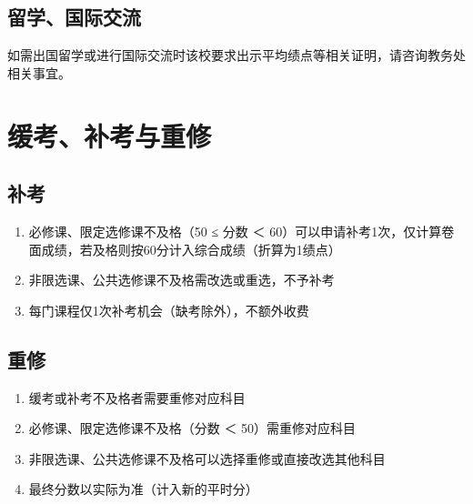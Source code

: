 \noindent{}

\subsection[留学、国际交流]{留学、国际交流}
如需出国留学或进行国际交流时该校要求出示平均绩点等相关证明，请咨询教务处相关事宜。

\section[缓考、补考与重修]{缓考、补考与重修}
\label{retake}

\subsection[补考]{补考}
\begin{enumerate}
    \item 必修课、限定选修课不及格（50 ≤ 分数 ＜ 60）可以申请补考1次，仅计算卷面成绩，若及格则按60分计入综合成绩（折算为1绩点）
    \item 非限选课、公共选修课不及格需改选或重选，不予补考
    \item 每门课程仅1次补考机会（缺考除外），不额外收费
\end{enumerate}

\subsection[重修]{重修}
\begin{enumerate}
    \item 缓考或补考不及格者需要重修对应科目
    \item 必修课、限定选修课不及格（分数 ＜ 50）需重修对应科目
    \item 非限选课、公共选修课不及格可以选择重修或直接改选其他科目
    \item 最终分数以实际为准（计入新的平时分）
\end{enumerate}

